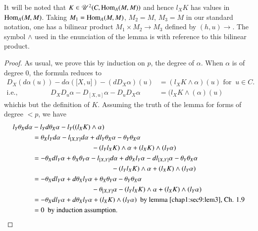 It will be noted that $ K \in \mathscr{U}^2  ( C, \operatorname{Hom}_A ( M,M )) $
and hence $l_X K$ has values in $ \operatorname{Hom}_A ( M,M ) $. Taking $
M_1 = \operatorname{Hom}_A ( M,M ) $, $ M_2 = M $, $ M_3 = M $ in our standard
notation, one has a bilinear product $ M_1 \times M_2  \to  M_3 $
defined by $ ( h,u ) \to $. The  symbol $\wedge$ used in the
enunciation of the lemma is with reference to this bilinear product.  

\begin{proof}
  As usual, we prove this by induction on $p$, the degree of
  $\alpha$. When $\alpha$ is of  degree $0$, the formula reduces to  
  \begin{align*}
    D_X ( d \alpha (u)) -d \alpha ( \big[ X,u \big ] ) - ( d D_X
    \alpha ) (u) & = ( l_X K \wedge \alpha ) (u) \text{ for } ~  u \in
    C.  \\ 
    \text{i.e.,}\hspace{2cm}   D_X D_u \alpha - D_{[ X,u ]} \alpha -
    D_u D_X \alpha&  = (l_X K \wedge (\alpha) (u)  
  \end{align*}
  which\pageoriginale is but the definition of $K$. Assuming the truth of the  lemma
  for forms of degree $ < p $, we have 
  \begin{align*}
    l_Y \theta_X d \alpha & - l_Y d \theta_X \alpha -l_Y((l_X K)
    \wedge \alpha)\\ 
    &= \theta_X l_Y d \alpha-l_{[ X,Y ]} d  \alpha + d l_Y \theta_X
    \alpha - \theta_Y \theta_X \alpha\\ 
    & \hspace{3cm}- ( l_Y l_X K ) \wedge \alpha +
    ( l_X K ) \wedge ( l_Y \alpha ) \\ 
    &=  - \theta_X d l_Y \alpha + \theta_X \theta_Y \alpha - l_{[ X,Y
    ]} d \alpha + d \theta_X  l_Y \alpha - dl_{[ X,Y ]} \alpha-
    \theta_Y \theta_X \alpha\\ 
    & \hspace{4cm}- ( l_Y l_X K ) \wedge \alpha + ( l_X K
    )\wedge ( l_Y \alpha ) \\  
    &= - \theta_X d l_Y \alpha + d \theta_X l_Y  \alpha + \theta_X
    \theta_Y \alpha -\theta_Y \theta_X \alpha\\ 
    & \hspace{3cm}- \theta_{[ X,Y ]}
    \alpha- ( l_Y l_X K ) \wedge \alpha +  ( l_X K ) \wedge ( l_Y
    \alpha ) \\ 
    &= - \theta_X d l_Y \alpha + d \theta_X l_Y \alpha + ( l_X K )
    \wedge ( l_Y \alpha ) ~ \text{ by lemma \ref{chap1:sec9:lem3}, Ch. 1.9} \\ 
    &= 0 ~ \text{ by induction assumption}.
  \end{align*}
\end{proof}

